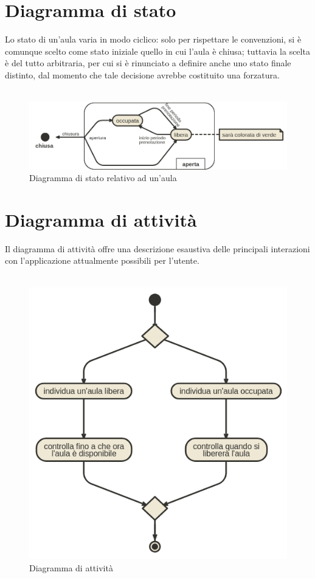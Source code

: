 \documentclass{article}
\begin{document}
	\section{Diagramma di stato}
	Lo stato di un'aula varia in modo ciclico: solo per rispettare le convenzioni, si è comunque scelto come stato iniziale quello in cui l'aula è chiusa; tuttavia la scelta è del tutto arbitraria, per cui si è rinunciato a definire anche uno stato finale distinto, dal momento che tale decisione avrebbe costituito una forzatura.\\\\
	\begin{figure}[h]
		\includegraphics[width=\textwidth]{stato}
		\centering
		\caption{Diagramma di stato relativo ad un'aula}
	\end{figure}
	\newpage
	\section{Diagramma di attività}
	Il diagramma di attività offre una descrizione esaustiva delle principali interazioni con l'applicazione attualmente possibili per l'utente.\\\\
	\begin{figure}[h]
		\includegraphics[width=\textwidth]{attivita}
		\centering
		\caption{Diagramma di attività}
	\end{figure}
	\newpage
\end{document}
